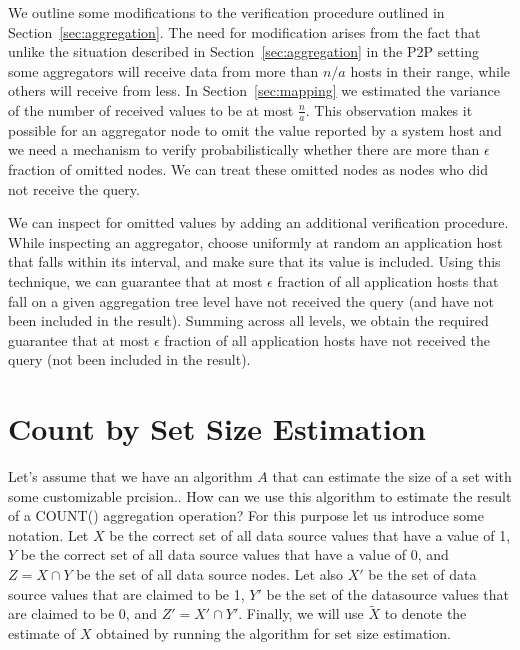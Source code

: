 \documentclass{article}
\begin{document}
We outline some modifications to the verification procedure outlined
in Section~\ref{sec:aggregation}. The need for modification arises
from the fact that unlike the situation described in
Section~\ref{sec:aggregation} in the P2P setting some aggregators will
receive data from more than $n/a$ hosts in their range, while others will
receive from less. In Section~\ref{sec:mapping} we estimated the
variance of the number of received values to be at most
$\frac{n}{a}$. This observation makes it possible for an aggregator
node to omit the value reported by a system host and we need a mechanism
to verify probabilistically whether there are more than $\epsilon$
fraction of omitted nodes. We can treat these omitted nodes as nodes
who did not receive the query.

We can inspect for omitted values by adding an additional verification
procedure. While inspecting an aggregator, choose uniformly at random
an application host that falls within its interval, and make sure that
its value is included. Using this technique, we can guarantee that at
most $\epsilon$ fraction of all application hosts that fall on a given
aggregation tree level have not received the query (and have not been
included in the result). Summing across all levels, we obtain the
required guarantee that at most $\epsilon$ fraction of all application
hosts have not received the query (not been included in the result). 





\section{Count by Set Size Estimation}
Let's assume that we have an algorithm $A$ that can estimate the size
of a set with some customizable prcision.. How can we use this algorithm to
estimate the result of a COUNT() aggregation operation? For this
purpose let us introduce some notation. Let $X$ be the correct set of
all data source values that have a value of 1, $Y$ be the correct set
of all data source values that have a value of 0, and $Z = X \cap Y$
be the set of all data source nodes. Let also $X'$ be the set of data
source values that are claimed to be 1, $Y'$ be the set of the
datasource values that are claimed to be 0, and $Z' = X' \cap
Y'$. Finally, we will use $\widetilde{X}$ to denote the estimate of
$X$ obtained by running the algorithm for set size estimation. 
\end{document}
